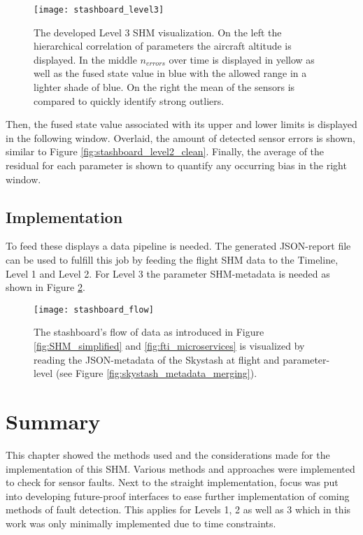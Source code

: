 \begin{figure}
    \centering
    \texttt{[image: stashboard\_level3]}
    \caption[Stashboard: Level 3 hierarchical configuration and fused state over time with detection range]{The developed Level 3 SHM visualization. On the left the hierarchical correlation of parameters the aircraft altitude is displayed. In the middle $n_{errors}$ over time is displayed in yellow as well as the fused state value in blue with the allowed range in a lighter shade of blue. On the right the mean of the sensors is compared to quickly identify strong outliers.}
    \label{fig:stashboard_level3}
\end{figure}

Then, the fused state value associated with its upper and lower limits is displayed in the following window. Overlaid, the amount of detected sensor errors is shown, similar to Figure \ref{fig:stashboard_level2_clean}. Finally, the average of the residual for each parameter is shown to quantify any occurring bias in the right window.

\subsection{Implementation}
To feed these displays a data pipeline is needed. The generated JSON-report file can be used to fulfill this job by feeding the flight SHM data to the Timeline, Level 1 and Level 2. For Level 3 the parameter SHM-metadata is needed as shown in Figure \ref{fig:stashboard_flow}.

\begin{figure}[!h]
    \centering
    \texttt{[image: stashboard\_flow]}
    \caption[Stashboard: Visualization of the data flow]{The stashboard's flow of data as introduced in Figure \ref{fig:SHM_simplified} and \ref{fig:fti_microservices} is visualized by reading the JSON-metadata of the Skystash at flight and parameter-level (see Figure \ref{fig:skystash_metadata_merging}). }
    \label{fig:stashboard_flow}
\end{figure}





\newpage


\section{Summary}

This chapter showed the methods used and the considerations made for the implementation of this SHM. Various methods and approaches were implemented to check for sensor faults. Next to the straight implementation, focus was put into developing future-proof interfaces to ease further implementation of coming methods of fault detection. This applies for Levels 1, 2 as well as 3 which in this work was only minimally implemented due to time constraints.





